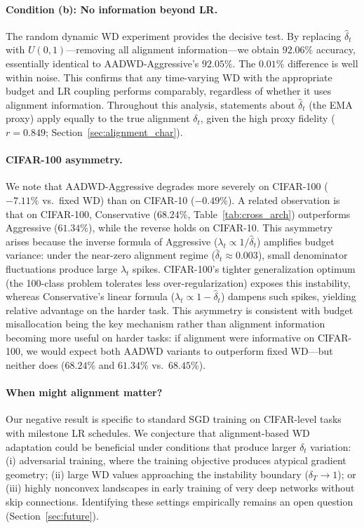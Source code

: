 \documentclass{article}
\begin{document}
\paragraph{Condition (b): No information beyond LR.}
The random dynamic WD experiment provides the decisive test.
By replacing $\hat{\delta}_t$ with $U(0,1)$---removing all alignment
information---we obtain $92.06\%$ accuracy, essentially identical to
AADWD-Aggressive's $92.05\%$.
The $0.01\%$ difference is well within noise.
This confirms that any time-varying WD with the appropriate budget and LR coupling
performs comparably, regardless of whether it uses alignment information.
Throughout this analysis, statements about $\hat{\delta}_t$ (the EMA proxy) apply
equally to the true alignment $\delta_t$, given the high proxy fidelity
($r = 0.849$; Section~\ref{sec:alignment_char}).

\paragraph{CIFAR-100 asymmetry.}
We note that AADWD-Aggressive degrades more severely on CIFAR-100 ($-7.11\%$ vs.\
fixed WD) than on CIFAR-10 ($-0.49\%$).
A related observation is that on CIFAR-100, Conservative ($68.24\%$,
Table~\ref{tab:cross_arch}) outperforms Aggressive ($61.34\%$), while the
reverse holds on CIFAR-10.
This asymmetry arises because the inverse formula of Aggressive
($\lambda_t \propto 1/\hat{\delta}_t$) amplifies budget variance: under the
near-zero alignment regime ($\hat{\delta}_t \approx 0.003$), small denominator
fluctuations produce large $\lambda_t$ spikes.
CIFAR-100's tighter generalization optimum (the 100-class problem tolerates less
over-regularization) exposes this instability, whereas Conservative's linear formula
($\lambda_t \propto 1 - \hat{\delta}_t$) dampens such spikes, yielding relative
advantage on the harder task.
This asymmetry is consistent with budget misallocation being the key mechanism
rather than alignment information becoming more useful on harder tasks: if alignment
were informative on CIFAR-100, we would expect both AADWD variants to outperform
fixed WD---but neither does ($68.24\%$ and $61.34\%$ vs.\ $68.45\%$).

\paragraph{When might alignment matter?}
Our negative result is specific to standard SGD training on CIFAR-level tasks with
milestone LR schedules.
We conjecture that alignment-based WD adaptation could be beneficial under conditions
that produce larger $\delta_t$ variation:
(i) adversarial training, where the training objective produces atypical gradient
geometry;
(ii) large WD values approaching the instability boundary ($\delta_T \to 1$); or
(iii) highly nonconvex landscapes in early training of very deep networks without
skip connections.
Identifying these settings empirically remains an open question
(Section~\ref{sec:future}).
\end{document}
